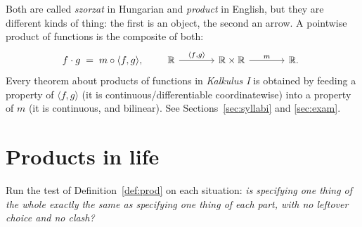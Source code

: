 \documentclass[11pt,a4paper]{article}
\theoremstyle{definition}
\begin{document}
Both are called \emph{szorzat} in Hungarian and \emph{product} in English, but they are
different kinds of thing: the first is an object, the second an arrow.  A pointwise
product of functions is the composite of both:
\[
  f\cdot g \;=\; m\circ\langle f,g\rangle ,
  \qquad
  \begin{tikzcd}[ampersand replacement=\&,column sep=large]
  \mathbb{R} \arrow[r,"\langle f{,}g\rangle"] \& \mathbb{R}\times\mathbb{R} \arrow[r,"m"] \& \mathbb{R} .
  \end{tikzcd}
\]
Every theorem about products of functions in \emph{Kalkulus I} is obtained by feeding a
property of $\langle f,g\rangle$ (it is continuous/differentiable coordinatewise) into a
property of $m$ (it is continuous, and bilinear).  See
Sections~\ref{sec:syllabi} and \ref{sec:exam}.

\section{Products in life}\label{sec:life}

Run the test of Definition~\ref{def:prod} on each situation: \emph{is specifying one thing
of the whole exactly the same as specifying one thing of each part, with no leftover choice
and no clash?}
\end{document}
